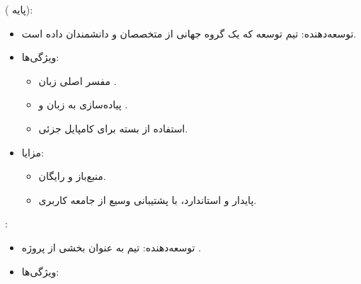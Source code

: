 \documentclass[11pt, a4paper, oneside]{book}
\newcounter{itemadded}
\let\LaTeXStandardEnumerateBegin\enumerate
\let\LaTeXStandardEnumerateEnd\endenumerate
\renewenvironment{enumerate}{%
	\LaTeXStandardEnumerateBegin%
	\setcounter{itemadded}{0}
}{%
	\LaTeXStandardEnumerateEnd%
}%
\begin{document}
			\begin{enumerate}
				
				\item {\large {} ( پایه)}:
				
				\begin{itemize}
					
					\item  {\large توسعه‌دهنده}:
					{\normalsize تیم توسعه  که یک گروه جهانی از متخصصان و دانشمندان داده است.}
					
					\item {\large ویژگی‌ها}:
					
					\begin{itemize}
						
						\item مفسر اصلی زبان .
						
						\item پیاده‌سازی به زبان  و .
						
						\item استفاده از بسته  برای کامپایل جزئی.
						
					\end{itemize}
					
					\item {\large مزایا}:
					
					\begin{itemize}
						
						\item منبع‌باز و رایگان.
						
						\item پایدار و استاندارد، با پشتیبانی وسیع از جامعه کاربری.
						
					\end{itemize}
					
				\end{itemize}
				
				
				\item {\large {}}:
				
				\begin{itemize}
					
					\item  {\large توسعه‌دهنده}:
					{\normalsize تیم  به عنوان بخشی از پروژه .}
					
					\item {\large ویژگی‌ها}:
					
					\begin{itemize}
						

\end{itemize}
\end{itemize}
\end{enumerate}
\end{document}
